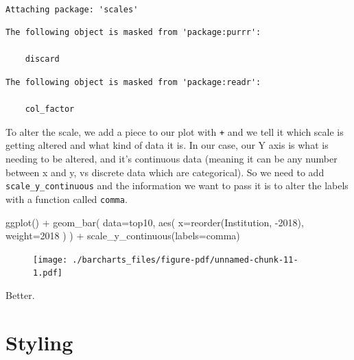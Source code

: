 \documentclass[
  letterpaper,
  DIV=11,
  numbers=noendperiod]{scrreprt}
\newenvironment{Shaded}{\begin{snugshade}}{\end{snugshade}}
\newcommand{\AttributeTok}[1]{\textcolor[rgb]{0.40,0.45,0.13}{#1}}
\newcommand{\FunctionTok}[1]{\textcolor[rgb]{0.28,0.35,0.67}{#1}}
\newcommand{\NormalTok}[1]{\textcolor[rgb]{0.00,0.23,0.31}{#1}}
\newcommand{\SpecialCharTok}[1]{\textcolor[rgb]{0.37,0.37,0.37}{#1}}
\newcommand{\StringTok}[1]{\textcolor[rgb]{0.13,0.47,0.30}{#1}}
\begin{document}
\begin{verbatim}

Attaching package: 'scales'
\end{verbatim}

\begin{verbatim}
The following object is masked from 'package:purrr':

    discard
\end{verbatim}

\begin{verbatim}
The following object is masked from 'package:readr':

    col_factor
\end{verbatim}

To alter the scale, we add a piece to our plot with \texttt{+} and we
tell it which scale is getting altered and what kind of data it is. In
our case, our Y axis is what is needing to be altered, and it's
continuous data (meaning it can be any number between x and y, vs
discrete data which are categorical). So we need to add
\texttt{scale\_y\_continuous} and the information we want to pass it is
to alter the labels with a function called \texttt{comma}.

\begin{Shaded}
\begin{Highlighting}[]
\FunctionTok{ggplot}\NormalTok{() }\SpecialCharTok{+} 
  \FunctionTok{geom\_bar}\NormalTok{(}
    \AttributeTok{data=}\NormalTok{top10, }
    \FunctionTok{aes}\NormalTok{(}
      \AttributeTok{x=}\FunctionTok{reorder}\NormalTok{(Institution, }\SpecialCharTok{{-}}\StringTok{\textasciigrave{}}\AttributeTok{2018}\StringTok{\textasciigrave{}}\NormalTok{), }
      \AttributeTok{weight=}\StringTok{\textasciigrave{}}\AttributeTok{2018}\StringTok{\textasciigrave{}}
\NormalTok{      )}
\NormalTok{    ) }\SpecialCharTok{+} 
  \FunctionTok{scale\_y\_continuous}\NormalTok{(}\AttributeTok{labels=}\NormalTok{comma)}
\end{Highlighting}
\end{Shaded}

\begin{figure}[H]

{\centering \texttt{[image: ./barcharts\_files/figure-pdf/unnamed-chunk-11-1.pdf]}

}

\end{figure}

Better.

\hypertarget{styling}{%
\section{Styling}\label{styling}}
\end{document}
